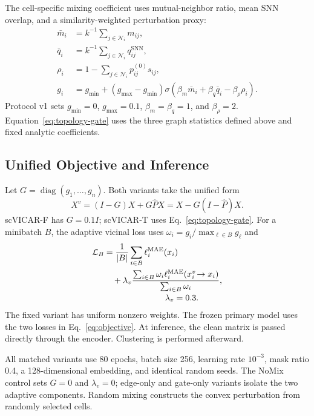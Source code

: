 The cell-specific mixing coefficient uses mutual-neighbor ratio, mean SNN overlap, and a
similarity-weighted perturbation proxy:
\begin{align}
 \bar m_i&=k^{-1}\sum_{j\in\mathcal N_i}m_{ij},\\
 \bar q_i&=k^{-1}\sum_{j\in\mathcal N_i}q_{ij}^{\mathrm{SNN}},\\
 \rho_i&=1-\sum_{j\in\mathcal N_i}p_{ij}^{(0)}s_{ij},\\
 g_i&=g_{\min}+(g_{\max}-g_{\min})
 \sigma(\beta_m\bar m_i+\beta_q\bar q_i-\beta_\rho\rho_i).
 \label{eq:topology-gate}
\end{align}
Protocol v1 sets $g_{\min}=0$, $g_{\max}=0.1$,
$\beta_m=\beta_q=1$, and $\beta_\rho=2$. Equation~\eqref{eq:topology-gate}
uses the three graph statistics defined above and fixed analytic coefficients.

\subsection{Unified Objective and Inference}

Let $G=\operatorname{diag}(g_1,\ldots,g_n)$.  Both variants take the unified
form
\begin{equation}
 X^v=(I-G)X+G\widehat P X
     =X-G(I-\widehat P)X .
 \label{eq:unified-view}
\end{equation}
scVICAR-F has $G=0.1I$; scVICAR-T uses Eq.~\eqref{eq:topology-gate}.  For a
minibatch $B$, the adaptive vicinal loss uses
$\omega_i=g_i/\max_{\ell\in B}g_\ell$ and
\begin{equation}
\begin{aligned}
 \mathcal L_B
 &=\frac{1}{|B|}\sum_{i\in B}\ell_i^{\mathrm{MAE}}(x_i)\\
 &\quad+\lambda_v
 \frac{\sum_{i\in B}\omega_i
 \ell_i^{\mathrm{MAE}}(x_i^v\!\rightarrow x_i)}
 {\sum_{i\in B}\omega_i},\\[-2pt]
 &\hspace{7.2em}\lambda_v=0.3.
\end{aligned}
 \label{eq:objective}
\end{equation}
The fixed variant has uniform nonzero weights. The frozen primary model uses
the two losses in Eq.~\eqref{eq:objective}. At inference, the clean matrix is
passed directly through the encoder. Clustering is performed afterward.

All matched variants use 80 epochs, batch size 256, learning rate $10^{-3}$,
mask ratio 0.4, a 128-dimensional embedding, and identical random seeds.  The
NoMix control sets $G=0$ and $\lambda_v=0$; edge-only and gate-only variants
isolate the two adaptive components. Random mixing constructs the convex
perturbation from randomly selected cells.
